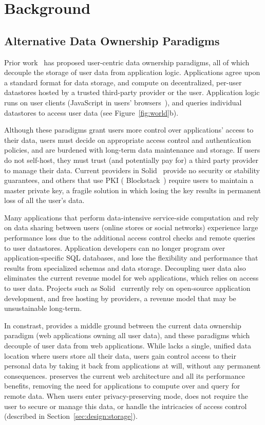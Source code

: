 \section{Background}

\subsection{Alternative Data Ownership Paradigms}
Prior work~\cite{solid, amber, w5, blockstack, bstore} has proposed user-centric data ownership
paradigms, all of which decouple the storage of user data from application logic. Applications agree
upon a standard format for data storage, and compute on decentralized, per-user datastores hosted by
a trusted third-party provider or the user.  Application logic runs on user clients (\eg JavaScript
in users' browsers~\cite{solid, blockstack, bstore}), and queries individual datastores to access
user data (see Figure~\ref{fig:world}b).

Although these paradigms grant users more control over applications' access to their data, users
must decide on appropriate access control and authentication policies, and are burdened with
long-term data maintenance and storage. If users do not self-host, they must trust (and potentially
pay for) a third party provider to manage their data. Current providers in Solid~\cite{solid}
provide no security or stability guarantees, and others that use PKI (\eg
Blockstack~\cite{blockstack}) require users to maintain a master private key, a fragile solution in
which losing the key results in permanent loss of all the user's data.

Many applications that perform data-intensive service-side computation and rely on data sharing
between users (\eg online stores or social networks) experience large performance loss due to the
additional access control checks and remote queries to user datastores. Application
developers can no longer program over application-specific SQL databases, and lose the flexibility and performance that results from specialized schemas and data storage.
Decoupling user data also eliminates the current revenue model for web applications, which relies on access
to user data. Projects such as Solid~\cite{solid} currently rely on open-source application
development, and free hosting by providers, a revenue model that may be unsustainable
long-term.

In constrast, \name provides a middle ground between the current data ownership paradigm (web
applications owning all user data), and these paradigms which decouple of user data from web applications. 
While \name lacks a single, unified data location where users store all their data,
users gain control access to their personal data by taking it back from applications at will, without
any permanent consequences.  \name preserves the current web architecture and all
its performance benefits, removing the need for applications to compute over and query for remote
data.  When users enter privacy-preserving mode, \name does not require the user
to secure or manage this data, or handle the intricacies of access control (described in
Section~\ref{sec:design:storage}).


